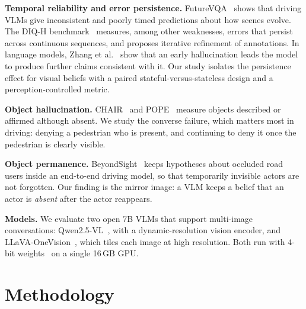 \documentclass[conference]{IEEEtran}
\begin{document}
\textbf{Temporal reliability and error persistence.} FutureVQA~\cite{chang2026futurevqa} shows that driving VLMs give inconsistent and poorly timed predictions about how scenes evolve. The DIQ-H benchmark~\cite{wan2025diqh} measures, among other weaknesses, errors that persist across continuous sequences, and proposes iterative refinement of annotations. In language models, Zhang et al.~\cite{zhang2023snowball} show that an early hallucination leads the model to produce further claims consistent with it. Our study isolates the persistence effect for visual beliefs with a paired stateful-versus-stateless design and a perception-controlled metric.

\textbf{Object hallucination.} CHAIR~\cite{rohrbach2018chair} and POPE~\cite{li2023pope} measure objects described or affirmed although absent. We study the converse failure, which matters most in driving: denying a pedestrian who is present, and continuing to deny it once the pedestrian is clearly visible.

\textbf{Object permanence.} BeyondSight~\cite{papais2026beyondsight} keeps hypotheses about occluded road users inside an end-to-end driving model, so that temporarily invisible actors are not forgotten. Our finding is the mirror image: a VLM keeps a belief that an actor is \emph{absent} after the actor reappears.

\textbf{Models.} We evaluate two open 7B VLMs that support multi-image conversations: Qwen2.5-VL~\cite{bai2025qwen25vl}, with a dynamic-resolution vision encoder, and LLaVA-OneVision~\cite{li2024llavaov}, which tiles each image at high resolution. Both run with 4-bit weights~\cite{dettmers2023qlora} on a single 16\,GB GPU.

\section{Methodology}
\end{document}
